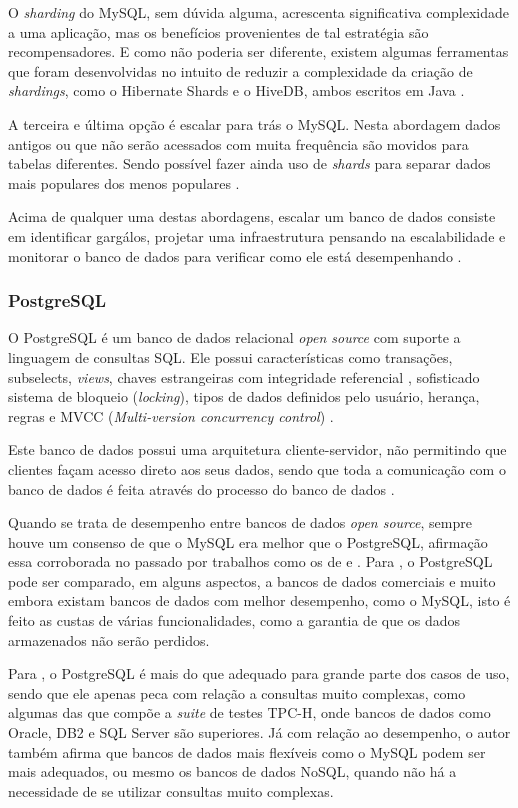 \documentclass[diss]{template/setrem}
\begin{document}
O \emph{sharding} do MySQL, sem dúvida alguma, acrescenta significativa complexidade a uma aplicação, mas os benefícios provenientes de tal estratégia são recompensadores. E como não poderia ser diferente, existem algumas ferramentas que foram desenvolvidas no intuito de reduzir a complexidade da criação de \emph{shardings}, como o Hibernate Shards e o HiveDB, ambos escritos em Java \citep{Schwartz2008}.

A terceira e última opção é escalar para trás o MySQL. Nesta abordagem dados antigos ou que não serão acessados com muita frequência são movidos para tabelas diferentes. Sendo possível fazer ainda uso de \emph{shards} para separar dados mais populares dos menos populares \citep{Schwartz2008}.

Acima de qualquer uma destas abordagens, escalar um banco de dados consiste em identificar gargálos, projetar uma infraestrutura pensando na escalabilidade e monitorar o banco de dados para verificar como ele está desempenhando \citep{Henderson2006}.

\subsubsection{PostgreSQL}
O PostgreSQL é um banco de dados relacional \emph{open source} com suporte a linguagem de consultas SQL. Ele possui características como transações, subselects, \emph{views}, chaves estrangeiras com integridade referencial , sofisticado sistema de bloqueio (\emph{locking}), tipos de dados definidos pelo usuário, herança, regras e MVCC (\emph{Multi-version concurrency control}) \citep{Matthew2005}.

Este banco de dados possui uma arquitetura cliente-servidor, não permitindo que clientes façam acesso direto aos seus dados, sendo que toda a comunicação com o banco de dados é feita através do processo do banco de dados \citep{Matthew2005}.

Quando se trata de desempenho entre bancos de dados \emph{open source}, sempre houve um consenso de que o MySQL era melhor que o PostgreSQL, afirmação essa corroborada no passado por trabalhos como os de \citet{Delfino2005} e \citet{Pires2006}. Para \citet{Matthew2005}, o PostgreSQL pode ser comparado, em alguns aspectos, a bancos de dados comerciais e muito embora existam bancos de dados com melhor desempenho, como o MySQL, isto é feito as custas de várias funcionalidades, como a garantia de que os dados armazenados não serão perdidos.

Para \citet{Smith2010}, o PostgreSQL é mais do que adequado para grande parte dos casos de uso, sendo que ele apenas peca com relação a consultas muito complexas, como algumas das que compõe a \emph{suite} de testes TPC-H, onde bancos de dados como Oracle, DB2 e SQL Server são superiores. Já com relação ao desempenho, o autor também afirma que bancos de dados mais flexíveis como o MySQL podem ser mais adequados, ou mesmo os bancos de dados NoSQL, quando não há a necessidade de se utilizar consultas muito complexas.
\end{document}
